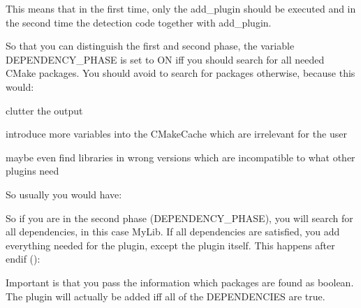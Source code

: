 This means that in the first time, only the {\ttfamily add\+\_\+plugin} should be executed and in the second time the detection code together with {\ttfamily add\+\_\+plugin}.

So that you can distinguish the first and second phase, the variable {\ttfamily D\+E\+P\+E\+N\+D\+E\+N\+C\+Y\+\_\+\+P\+H\+A\+SE} is set to {\ttfamily ON} iff you should search for all needed C\+Make packages. You should avoid to search for packages otherwise, because this would\+:


\begin{DoxyItemize}
\item clutter the output
\item introduce more variables into the {\ttfamily C\+Make\+Cache} which are irrelevant for the user
\item maybe even find libraries in wrong versions which are incompatible to what other plugins need
\end{DoxyItemize}

So usually you would have\+:


\begin{DoxyCode}{0}
\end{DoxyCode}


So if you are in the second phase ({\ttfamily D\+E\+P\+E\+N\+D\+E\+N\+C\+Y\+\_\+\+P\+H\+A\+SE}), you will search for all dependencies, in this case {\ttfamily My\+Lib}. If all dependencies are satisfied, you add everything needed for the plugin, except the plugin itself. This happens after {\ttfamily endif ()}\+:


\begin{DoxyCode}{0}
\DoxyCodeLine{        )}
\end{DoxyCode}


Important is that you pass the information which packages are found as boolean. The plugin will actually be added iff all of the {\ttfamily D\+E\+P\+E\+N\+D\+E\+N\+C\+I\+ES} are true.

